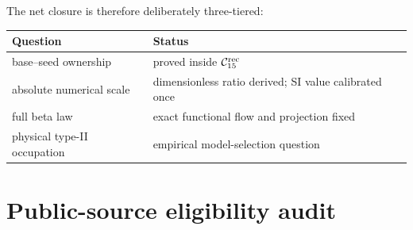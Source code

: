 \documentclass[11pt]{article}
\begin{document}
The net closure is therefore deliberately three-tiered:
\begin{center}
\begin{tabular}{@{}ll@{}}
\toprule
Question & Status\\
\midrule
base--seed ownership & proved inside \(\mathcal C_{15}^{\rm rec}\)\\
absolute numerical scale & dimensionless ratio derived; SI value calibrated once\\
full beta law & exact functional flow and projection fixed\\
physical type-II occupation & empirical model-selection question\\
\bottomrule
\end{tabular}
\end{center}


\section{Public-source eligibility audit}
\end{document}
